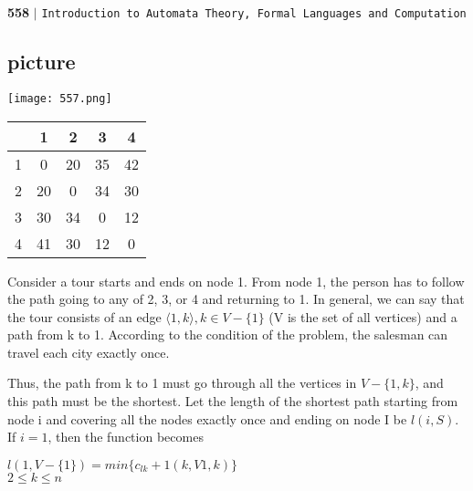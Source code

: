 \documentclass[11pt]{article}
\begin{document}
\newpage
\begin{flushleft}
    \textbf{558}\hspace*{0.1cm} \textbf{$|$} \hspace*{0.1cm} \texttt{Introduction to Automata Theory, Formal Languages and Computation}
  \end{flushleft}

\vspace*{0.5cm}
\begin{multicols}{2}
\begin{center}
\section{picture}
\texttt{[image: 557.png]}
\end{center}

\begin{center}
\begin{tabular}{|c|c|c|c|c|}
 \hline

 \hline
  & 1 & 2  & 3   & 4\\
\hline
1 & 0 & 20 & 35  &42\\
\hline
2 & 20& 0  & 34  &30\\
\hline
3 & 30& 34 & 0   &12\\
\hline
4 & 41& 30 &12   &0\\
 \hline

 \hline

 \hline
\end{tabular}
\end{center}
\end{multicols}


\hspace*{0.5cm} Consider a tour starts and ends on node 1. From node 1, the person has to follow the path going
to any of 2, 3, or 4 and returning to 1. In general, we can say that the tour consists of an edge
$\langle1, k\rangle , k \in V -\{1\}$ (V is the set of all vertices) and a path from k to 1. According to the condition of the
problem, the salesman can travel each city exactly once.

 Thus, the path from k to 1 must go through
all the vertices in $V -\{1, k\}$, and this path must be the shortest. Let the length of the shortest path
starting from node i and covering all the nodes exactly once and ending on node I be $l(i, S)$. If $i = 1$,
then the function becomes\\

\begin{center}

$l(1,V - \{1\}) = min \{c _{lk} +1 (k,V {1,k})\}$\\
\hspace*{0.1cm} \tiny{$2\leq k \leq n$} \\
\end{center}
\end{document}

